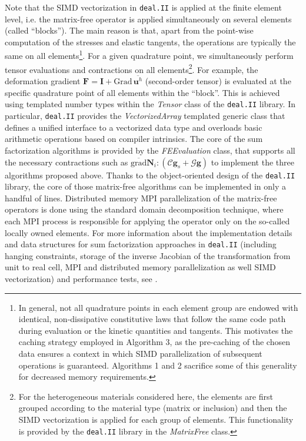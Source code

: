 \documentclass[AMA,STIX1COL]{WileyNJD-v2}
\newcommand*{\gz}[1]{\boldsymbol{#1}}
\newcommand*{\Grad}{\mathrm{Grad}}
\newcommand*{\grad}{\mathrm{grad}}
\begin{document}
Note that the SIMD vectorization
in \texttt{deal.II} \cite{dealII90}
is applied at the finite element level, i.e. the matrix-free operator is applied simultaneously on several elements (called ``blocks'').
The main reason is that, apart from the point-wise computation of the stresses and elastic tangents, the operations are typically the same on all elements\footnote{%
In general, not all quadrature points in each element group are endowed with identical, non-dissipative constitutive laws that follow the same code path during evaluation or the kinetic quantities and tangents.
This motivates the caching strategy employed in Algorithm 3, as the pre-caching of the chosen data ensures a context in which SIMD parallelization of subsequent operations is guaranteed.
Algorithms 1 and 2 sacrifice some of this generality for decreased memory requirements.
}.
For a given quadrature point, we simultaneously perform tensor evaluations and contractions on all elements\footnote{%
For the heterogeneous materials considered here,
the elements are first grouped according to the material type (matrix or inclusion) and then the SIMD vectorization is applied for each group of elements.
This functionality is provided by the \texttt{deal.II} library in the \textit{MatrixFree} class.
}.
For example, the deformation gradient $\gz F = \gz I + \Grad \, \overline{\gz u^h}$ (second-order tensor) is evaluated at the specific quadrature point of all elements within the ``block''.
This is achieved using templated number types within the \textit{Tensor} class of the \texttt{deal.II} library.
In particular, \texttt{deal.II} provides the \textit{VectorizedArray} templated generic class that defines a unified interface to a vectorized data type
and overloads basic arithmetic operations based on compiler intrinsics.
The core of the sum factorization algorithms is provided by the
\textit{FEEvaluation} class, that supports all the necessary contractions such as $\overline{\grad} \gz N_i : (\boldsymbol{\mathcal{C}}\gz g_s  + \boldsymbol{\mathcal{G}} \gz g)$ to implement the three algorithms proposed above.
Thanks to the object-oriented design of the \texttt{deal.II} library, the core of those matrix-free algorithms can be implemented in only a handful of lines.
Distributed memory MPI parallelization of the matrix-free operators is done using the standard domain decomposition technique, where each MPI process is responsible for applying the operator only on the so-called locally owned elements.
For more information about the implementation details and data structures for sum factorization approaches in \texttt{deal.II} (including hanging constraints, storage of the inverse Jacobian of the transformation from unit to real cell, MPI and distributed memory parallelization as well SIMD vectorization) and performance tests, see \cite{kronbichler12}.
\end{document}
